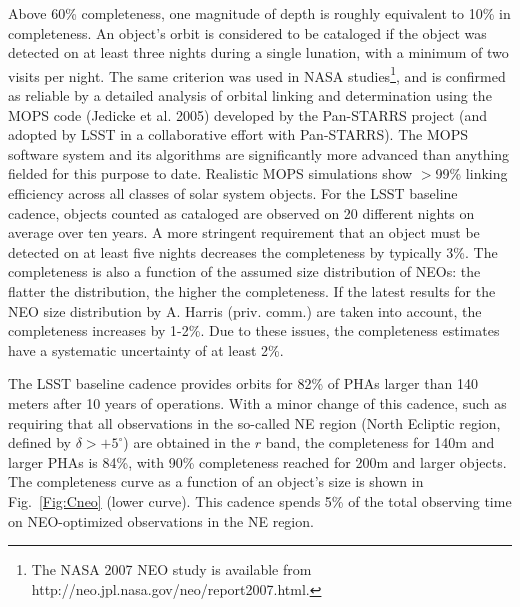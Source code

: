 \documentclass{emulateapj}
\begin{document}
Above 60\% completeness, one magnitude of depth is roughly
equivalent to 10\% in completeness.  An object's orbit is considered to be 
cataloged if the object was detected on at least three nights during a single 
lunation, with a minimum of two visits per night. The same criterion
was used in NASA studies\footnote{The NASA 2007 NEO study is available from
http://neo.jpl.nasa.gov/neo/report2007.html.}, and is confirmed as
reliable by a detailed analysis of orbital linking and determination using
the MOPS code (Jedicke et al. 2005) developed by the Pan-STARRS project (and 
adopted by LSST in a collaborative effort with Pan-STARRS). The MOPS software
system and its algorithms are significantly more advanced than anything
fielded for this purpose to date. Realistic MOPS simulations show 
$>$99\% linking efficiency across all classes of solar system objects. 
For the LSST baseline cadence, objects
counted as cataloged are observed on 20 different nights on average over ten
years. A more stringent requirement that an object must be detected on at least 
five nights decreases the completeness by typically 3\%. The completeness is also a
function of the assumed size distribution of NEOs: the flatter the distribution, the 
higher the completeness. If the latest results for the NEO size
distribution by A. Harris (priv. comm.) are taken into account, the
completeness increases by 1-2\%. Due to these issues, the completeness
estimates have a systematic uncertainty of at least 2\%. 

The LSST baseline cadence provides orbits for 82\% of PHAs larger than 140
meters after 10 years of operations. With a minor change of this cadence, such as
requiring that all observations in the so-called NE region (North Ecliptic 
region, defined by $\delta >+5^\circ$) are obtained in the $r$ band, the completeness 
for 140m and larger PHAs is 84\%, with 90\% completeness reached for 200m and 
larger objects. The completeness curve as a function of an object's size is shown 
in Fig.~\ref{Fig:Cneo} (lower curve). This cadence spends 5\% of the total 
observing time on NEO-optimized observations in the NE region. 
\end{document}
